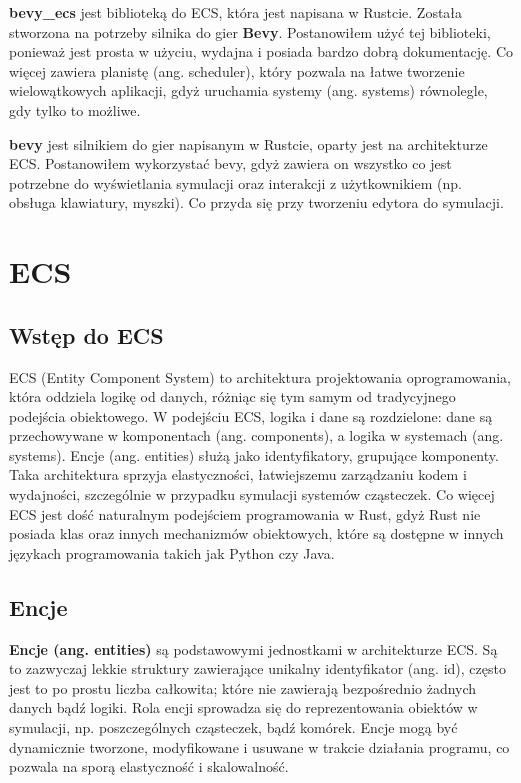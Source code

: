 \documentclass[11pt]{article}
\begin{document}
\textbf{bevy\_ecs} jest biblioteką do ECS, która jest napisana w Rustcie. Została stworzona na potrzeby silnika do gier \textbf{Bevy}.
Postanowiłem użyć tej biblioteki, ponieważ jest prosta w użyciu, wydajna i posiada bardzo dobrą dokumentację. Co więcej zawiera
planistę (ang. scheduler), który pozwala na łatwe tworzenie wielowątkowych aplikacji, gdyż uruchamia systemy (ang. systems) równolegle,
gdy tylko to możliwe.

\textbf{bevy} jest silnikiem do gier napisanym w Rustcie, oparty jest na architekturze ECS. Postanowiłem
wykorzystać bevy, gdyż zawiera on wszystko co jest potrzebne do wyświetlania symulacji oraz interakcji z użytkownikiem
(np. obsługa klawiatury, myszki). Co przyda się przy tworzeniu edytora do symulacji.

\section{ECS}
\subsection{Wstęp do ECS}
ECS (Entity Component System) to architektura projektowania oprogramowania, która oddziela logikę od danych,
różniąc się tym samym od tradycyjnego podejścia obiektowego. W podejściu ECS, logika i dane są rozdzielone:
dane są przechowywane w komponentach (ang. components), a logika w systemach (ang. systems). Encje (ang. entities)
służą jako identyfikatory, grupujące komponenty. Taka architektura sprzyja elastyczności, łatwiejszemu zarządzaniu kodem
i wydajności, szczególnie w przypadku symulacji systemów cząsteczek. Co więcej ECS jest dość naturalnym podejściem
programowania w Rust, gdyż Rust nie posiada klas oraz innych mechanizmów obiektowych, które są dostępne w innych językach
programowania takich jak Python czy Java.

\subsection{Encje}
\textbf{Encje (ang. entities)} są podstawowymi jednostkami w architekturze ECS. Są to zazwyczaj lekkie struktury zawierające
unikalny identyfikator (ang. id), często jest to po prostu liczba całkowita; które nie zawierają bezpośrednio żadnych danych
bądź logiki. Rola encji sprowadza się do reprezentowania obiektów w symulacji, np. poszczególnych cząsteczek, bądź komórek.
Encje mogą być dynamicznie tworzone, modyfikowane i usuwane w trakcie działania programu, co pozwala na sporą
elastyczność i skalowalność.
\end{document}
